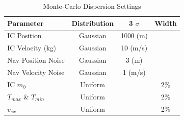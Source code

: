 \begin{table}[H]                                              
	\centering                                                     
	\begin{tabularx}{0.65\textwidth}{@{}lccc@{}}                             
		\toprule                                                         
		\bfseries Parameter & \bfseries Distribution & \bfseries 3 $\sigma$ & \bfseries Width \\                                 
		\toprule                                                
		IC Position & Gaussian & 1000 (m) & \\                                          
		
		IC Velocity (kg) & Gaussian & 10 (m/s) & \\                                  
		
		Nav Position Noise & Gaussian & 3 (m) & \\                               
		
		Nav Velocity Noise & Gaussian & 1 (m/s) & \\                                
		\toprule
		IC $m_{0}$ & Uniform &  & 2\% \\        
		
		$T_{max}$ \& $T_{min}$ & Uniform &  & 2\% \\                                  
		
		$v_{ex}$ & Uniform &  & 2\% \\              
		
		\bottomrule                                             
	\end{tabularx}                                                  
	\caption{Monte-Carlo Dispersion Settings}
	\label{tab:dispersion}                                         
\end{table}      
%
%
%

